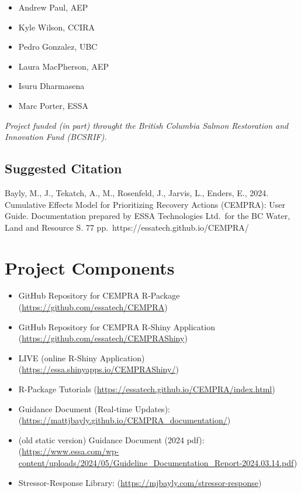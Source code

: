 \documentclass[
  letterpaper,
  DIV=11,
  numbers=noendperiod]{scrreprt}
\providecommand{\tightlist}{%
  \setlength{\itemsep}{0pt}\setlength{\parskip}{0pt}}
\begin{document}
\begin{itemize}
\tightlist
\item
  Andrew Paul, AEP
\item
  Kyle Wilson, CCIRA
\item
  Pedro Gonzalez, UBC
\item
  Laura MacPherson, AEP
\item
  Isuru Dharmasena
\item
  Marc Porter, ESSA
\end{itemize}

{\emph{Project funded (in part) throught the British Columbia Salmon
Restoration and Innovation Fund (BCSRIF).}}

\subsection*{Suggested Citation}\label{suggested-citation}

Bayly, M., J., Tekatch, A., M., Rosenfeld, J., Jarvis, L., Enders, E.,
2024. Cumulative Effects Model for Prioritizing Recovery Actions
(CEMPRA): User Guide. Documentation prepared by ESSA Technologies
Ltd.~for the BC Water, Land and Resource S. 77
pp.~https://essatech.github.io/CEMPRA/

\section*{Project Components}\label{project-components}


\begin{itemize}
\tightlist
\item
  GitHub Repository for CEMPRA R-Package
  (\url{https://github.com/essatech/CEMPRA})
\item
  GitHub Repository for CEMPRA R-Shiny Application
  (\url{https://github.com/essatech/CEMPRAShiny})
\item
  LIVE (online R-Shiny Application)
  (\url{https://essa.shinyapps.io/CEMPRAShiny/})
\item
  R-Package Tutorials
  (\url{https://essatech.github.io/CEMPRA/index.html})
\item
  Guidance Document (Real-time Updates):
  (\url{https://mattjbayly.github.io/CEMPRA_documentation/})
\item
  (old static version) Guidance Document (2024 pdf):
  (\url{https://www.essa.com/wp-content/uploads/2024/05/Guideline_Documentation_Report-2024.03.14.pdf})
\item
  Stressor-Response Library:
  (\url{https://mjbayly.com/stressor-response})
\end{itemize}
\end{document}
